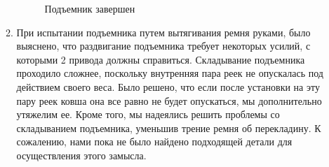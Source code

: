 \begin{enumerate}
\begin{enumerate}
      \begin{figure}[H]
      	\begin{minipage}[h]{1\linewidth}
      		\caption{Подъемник завершен}
      	\end{minipage}
      \end{figure}
      
      \item	При испытании подъемника путем вытягивания ремня руками, было выяснено, что раздвигание подъемника требует некоторых усилий, с которыми 2 привода должны справиться. Складывание подъемника проходило сложнее, поскольку внутренняя пара реек не опускалась под действием своего веса. Было решено, что если после установки на эту пару реек ковша она все равно не будет опускаться, мы дополнительно утяжелим ее. Кроме того, мы надеялись решить проблемы со складыванием подъемника, уменьшив трение ремня об перекладину. К сожалению, нами пока не было найдено подходящей детали для осуществления этого замысла.\newline
      

\end{enumerate}
\end{enumerate}
